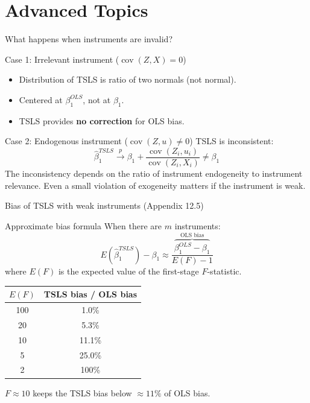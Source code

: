 \documentclass[10pt]{beamer}
\begin{document}
\section{Advanced Topics}

\begin{frame}{What happens when instruments are invalid?}
\label{slide:invalid_instruments}
\begin{block}{Case 1: Irrelevant instrument ($\operatorname{cov}(Z,X) = 0$)}
\begin{itemize}
  \item Distribution of TSLS is \alert{ratio of two normals} (not normal).
  \item Centered at $\beta_1^{OLS}$, not at $\beta_1$.
  \item TSLS provides \textbf{no correction} for OLS bias.
\end{itemize}
\end{block}

\pause
\begin{block}{Case 2: Endogenous instrument ($\operatorname{cov}(Z,u) \neq 0$)}
TSLS is \alert{inconsistent}:
\[
\widehat{\beta}_1^{TSLS} \xrightarrow{p} \beta_1 + \frac{\operatorname{cov}(Z_i, u_i)}{\operatorname{cov}(Z_i, X_i)} \neq \beta_1
\]
The inconsistency depends on the ratio of instrument endogeneity to instrument relevance. Even a small violation of exogeneity matters if the instrument is weak.
\end{block}
\end{frame}

\begin{frame}{Bias of TSLS with weak instruments (Appendix 12.5)}
\label{slide:bias_formula}
\begin{block}{Approximate bias formula}
When there are $m$ instruments:
\[
E(\widehat{\beta}_1^{TSLS}) - \beta_1 \approx \frac{\overbrace{\beta_1^{OLS} - \beta_1}^{\text{OLS bias}}}{E(F) - 1}
\]
where $E(F)$ is the expected value of the first-stage $F$-statistic.
\end{block}

\pause
\vspace{0.5em}
\begin{center}
\renewcommand{\arraystretch}{1.2}
\begin{tabular}{@{}cc@{}}
\toprule
$E(F)$ & TSLS bias / OLS bias \\
\midrule
100 & 1.0\% \\
20  & 5.3\% \\
10  & \alert{11.1\%} \\
5   & 25.0\% \\
2   & 100\% \\
\bottomrule
\end{tabular}
\end{center}
\vspace{0.3em}
$F \approx 10$ keeps the TSLS bias below $\approx 11\%$ of OLS bias.
\end{frame}
\end{document}
